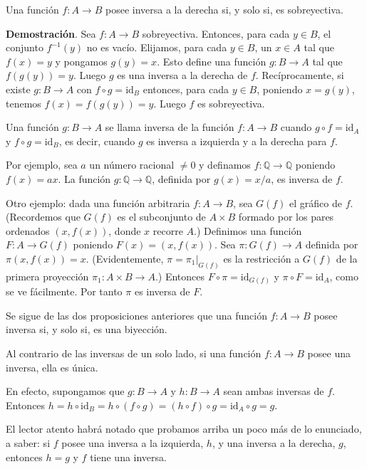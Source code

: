 \documentclass[12pt,oneside]{book}
\begin{document}
Una función \(f: A \to B\) posee inversa a la derecha si, y solo si, es sobreyectiva.

\textbf{Demostración}. Sea \(f: A \to B\) sobreyectiva. Entonces, para cada \(y \in B\), el conjunto \(f^{-1}(y)\) no es vacío. Elijamos, para cada \(y \in B\), un \(x \in A\) tal que \(f(x) = y\) y pongamos \(g(y) = x\). Esto define una función \(g: B \to A\) tal que \(f(g(y)) = y\). Luego \(g\) es una inversa a la derecha de \(f\). Recíprocamente, si existe \(g: B \to A\) con \(f \circ g = \text{id}_B\) entonces, para cada \(y \in B\), poniendo \(x = g(y)\), tenemos \(f(x) = f(g(y)) = y\). Luego \(f\) es sobreyectiva.

Una función \(g: B \to A\) se llama inversa de la función \(f: A \to B\) cuando \(g \circ f = \text{id}_A\) y \(f \circ g = \text{id}_B\), es decir, cuando \(g\) es inversa a izquierda y a la derecha para \(f\).

Por ejemplo, sea \(a\) un número racional \(\neq 0\) y definamos \(f: \mathbb{Q} \to \mathbb{Q}\) poniendo \(f(x) = ax\). La función \(g: \mathbb{Q} \to \mathbb{Q}\), definida por \(g(x) = x/a\), es inversa de \(f\).

Otro ejemplo: dada una función arbitraria \(f: A \to B\), sea \(G(f)\) el gráfico de \(f\). (Recordemos que \(G(f)\) es el subconjunto de \(A \times B\) formado por los pares ordenados \((x, f(x))\), donde \(x\) recorre \(A\).) Definimos una función \(F: A \to G(f)\) poniendo \(F(x) = (x, f(x))\). Sea \(\pi: G(f) \to A\) definida por \(\pi(x, f(x)) = x\). (Evidentemente, \(\pi = \pi_1 |_{G(f)}\) es la restricción a \(G(f)\) de la primera proyección \(\pi_1: A \times B \to A\).) Entonces \(F \circ \pi = \text{id}_{G(f)}\) y \(\pi \circ F = \text{id}_A\), como se ve fácilmente. Por tanto \(\pi\) es inversa de \(F\).

Se sigue de las dos proposiciones anteriores que una función \(f: A \to B\) posee inversa si, y solo si, es una biyección.

Al contrario de las inversas de un solo lado, si una función \(f: A \to B\) posee una inversa, ella es única.

En efecto, supongamos que \(g: B \to A\) y \(h: B \to A\) sean ambas inversas de \(f\). Entonces \(h = h \circ \text{id}_B = h \circ (f \circ g) = (h \circ f) \circ g = \text{id}_A \circ g = g\).

El lector atento habrá notado que probamos arriba un poco más de lo enunciado, a saber: si \(f\) posee una inversa a la izquierda, \(h\), y una inversa a la derecha, \(g\), entonces \(h = g\) y \(f\) tiene una inversa.
\end{document}
